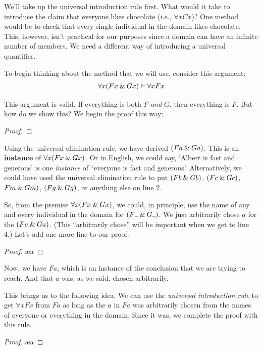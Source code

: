 We'll take up the universal introduction rule first. What would it take to introduce the claim that everyone likes chocolate (i.e., $\forall x Cx$)? One method would be to check that every single individual in the domain likes chocolate. This, however, isn’t practical for our purposes since a domain can have an infinite number of members.
We need a different way of introducing a universal quantifier.

To begin thinking about the method that we will use, consider this argument:
$$\forall x (Fx \mathbin{\&} Gx) \vdash \forall x Fx$$

\noindent This argument is valid. If everything is both $F$ \emph{and} $G$, then everything is $F$.  But how do we show this?  We begin the proof this way:
\begin{proof}
	 \pr{}
	 
\end{proof}
Using the universal elimination rule, we have derived $(Fa \mathbin{\&} Ga)$. This is an \textbf{instance} of $\forall x (Fx \mathbin{\&} Gx)$. Or in English, we could say, `Albert is fast and generous' is one \textit{instance} of\, `everyone is fast and generous'.
Alternatively, we could have used the universal elimination rule to put $(Fb \mathbin{\&} Gb)$, $(Fc \mathbin{\&} Gc)$, $Fm \mathbin{\&} Gm)$, $(Fg \mathbin{\&} Gg)$, or anything else on line 2.

So, from the premise $\forall x (Fx \mathbin{\&} Gx)$, we could, in principle, use the name of any and every individual in the domain for $(F\rule{1.7mm}{0.15mm} \eand G\rule{1.7mm}{0.15mm})$. We just arbitrarily chose $a$ for the $(Fa \mathbin{\&} Ga)$. (This ``arbitrarily chose'' will be important when we get to line 4.) Let's add one more line to our proof.
\begin{proof}
	 \pr{}
	 
	 \ae{a}
\end{proof}
Now, we have $Fa$, which is an instance of the conclusion that we are trying to reach. And that $a$ was, as we said, chosen arbitrarily. 

This brings us to the following idea. We can use the \textit{universal introduction rule} to get $\forall x Fx$ from $Fa$ as long as the $a$ in $Fa$ was arbitrarily chosen from the names of everyone or everything in the domain. Since it was, we complete the proof with this rule.

\begin{proof}
	 \pr{}
	 
	 \ae{a}
	 
\end{proof}


